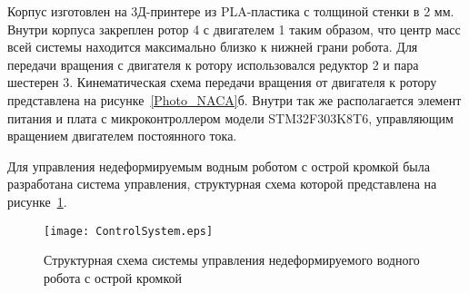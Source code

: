 Корпус изготовлен на 3Д-принтере из PLA-пластика с толщиной стенки в 2 мм. Внутри корпуса закреплен ротор 4 с двигателем 1 таким образом, что центр масс всей системы находится максимально близко к нижней грани робота. Для передачи вращения с двигателя к ротору использовался редуктор 2 и пара шестерен 3. Кинематическая схема передачи вращения от двигателя к ротору представлена на рисунке~\ref{Photo_NACA}б. Внутри так же располагается элемент питания и плата с микроконтроллером модели STM32F303K8T6, управляющим вращением двигателем постоянного тока. %



Для управления недеформируемым водным роботом с острой кромкой была разработана система управления, структурная схема которой представлена на рисунке~\ref{ControlSystem}.

\begin{figure}[!h]
	\centering
	\texttt{[image: ControlSystem.eps]}
	\caption{Структурная схема системы управления недеформируемого водного робота с острой кромкой}
	\label{ControlSystem}
\end{figure}


